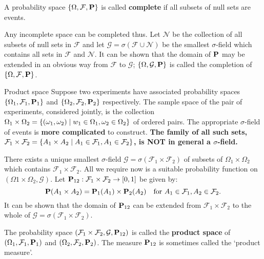 \begin{definition}
A probability space $\{\Omega, \mathcal{F}, \mathbf{P}\}$ is called \textbf{complete} if all subsets of null sets are events. 
\end{definition}

Any incomplete space can be completed thus. Let $\mathcal{N}$ be the collection of all subsets of null sets in $\mathcal{F}$ and let $\mathcal{G} = \sigma (\mathcal{F} \cup \mathcal{N})$ be the smallest $\sigma$-field which contains all sets in $\mathcal{F}$ 
and $\mathcal{N}$. It can be shown that the domain of $\mathbf{P}$ may be extended in an obvious way from $\mathcal{F}$ to $\mathcal{G}$; $\{\Omega, \mathcal{G}, \mathbf{P}\}$ is called the completion of $\{\Omega, \mathcal{F}, \mathbf{P}\}$. 

\begin{newnotion}{Product space}
Suppose two experiments have associated probability spaces $\{ \Omega_1, \mathcal{F}_1, \mathbf{P}_1 \}$ and  $\{ \Omega_2, \mathcal{F}_2, \mathbf{P}_2 \}$ respectively. The sample space of the pair of experiments, considered jointly, is the collection $\Omega_1 \times \Omega_2 = \{ (\omega_1 , \omega_2) \;\vert\; w_1 \in \Omega_1, \omega_2 \in \Omega_2 \}$ of ordered pairs. The appropriate $\sigma$-field of events is \textbf{more complicated} to construct. \textbf{The family of all such sets, $\mathcal{F}_1 \times \mathcal{F}_2 = \{A_1 \times A_2 \;\vert\; A_1 \in \mathcal{F}_1 , A_1 \in \mathcal{F}_2 \}$, is NOT in general a $\sigma$-field.}
\end{newnotion}

\begin{remark}
There exists a unique smallest $\sigma$-field $\mathcal{G} = \sigma(\mathcal{F}_1 \times \mathcal{F}_2)$ of subsets of $\Omega_1 \times \Omega_2$ which contains $\mathcal{F}_1 \times \mathcal{F}_2$. All we require now is a suitable probability function on $( \Omega1 \times \Omega_2, \mathcal{G} )$. Let $\mathbf{P}_{12}: \mathcal{F}_1 \times \mathcal{F}_2 \to [0, 1]$ be given by: 
\begin{equation*}
    \mathbf{P}(A_1 \times A_2) = \mathbf{P}_1(A_1) \times \mathbf{P}_2(A_2) \quad \text{for $A_1 \in \mathcal{F}_1, A_2 \in \mathcal{F}_2$}.
\end{equation*}
It can be shown that the domain of $\mathbf{P}_{12}$ can be extended from $\mathcal{F}_1 \times \mathcal{F}_2$ to the whole of $\mathcal{G} = \sigma(\mathcal{F}_1 \times \mathcal{F}_2)$.
\end{remark}

\begin{definition}
The probability space $(\mathcal{F}_1 \times \mathcal{F}_2, \mathcal{G}, \mathbf{P}_{12})$ is called the \textbf{product space} of $(\Omega_1, \mathcal{F}_1, \mathbf{P}_1)$ and  $(\Omega_2, \mathcal{F}_2, \mathbf{P}_2)$. The measure $\mathbf{P}_{12}$ is sometimes called the `product measure'. 
\end{definition}



